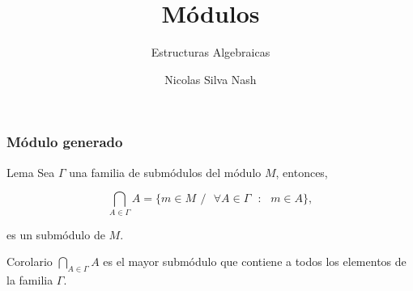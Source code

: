 \documentclass[notes=show]{beamer}%
\newenvironment{Lema}{\begin{block}{Lema}}{\end{block}}
\newenvironment{Corol}{\begin{block}{Corolario}}{\end{block}}
\begin{document}
\title{Módulos}
\subtitle{Estructuras Algebraicas}
\author{Nicolas Silva Nash}
\date{}
\maketitle

\bigskip%

\begin{frame}%


\bigskip%
\frametitle{Módulo generado}%




\begin{Lema}
Sea $\Gamma$ una familia de submódulos del módulo $M$, entonces,%

\[%
{\displaystyle\bigcap\limits_{A\in\Gamma}}
A=\{m\in M\,\ /\text{ }\forall A\in\Gamma\text{ }:\text{ }m\in A\},
\]


es un submódulo de $M$.
\end{Lema}

\begin{Corol}
$%
{\displaystyle\bigcap\limits_{A\in\Gamma}}
A$ es el mayor submódulo que contiene a todos los elementos de la familia
$\Gamma$.
\end{Corol}

%

\transboxout
\end{frame}%


\bigskip%
\end{document}

